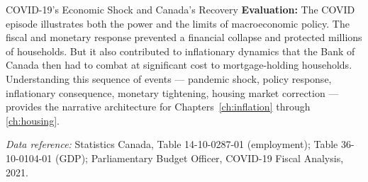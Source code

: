 \begin{casestudy}{COVID-19's Economic Shock and Canada's Recovery}
\textbf{Evaluation:} The COVID episode illustrates both the power and the
limits of macroeconomic policy. The fiscal and monetary response prevented
a financial collapse and protected millions of households. But it also
contributed to inflationary dynamics that the Bank of Canada then had to
combat at significant cost to mortgage-holding households. Understanding
this sequence of events --- pandemic shock, policy response, inflationary
consequence, monetary tightening, housing market correction --- provides
the narrative architecture for Chapters~\ref{ch:inflation} through
\ref{ch:housing}.

\textit{Data reference:} Statistics Canada, Table 14-10-0287-01 (employment);
Table 36-10-0104-01 (GDP); Parliamentary Budget Officer, COVID-19
Fiscal Analysis, 2021.
\end{casestudy}


